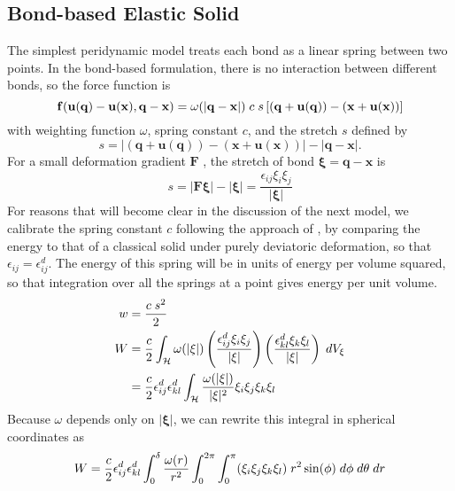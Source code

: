 \subsection{Bond-based Elastic Solid}
The simplest peridynamic model treats each bond as a linear spring between two points.
In the bond-based formulation, there is no interaction between different bonds, so the force function is
%
\begin{equation}
\mathit{\mathbf{f}}(\mathbf{u}(\mathbf{q})-\mathbf{u}(\mathbf{x}),\mathbf{q}-\mathbf{x}) = \omega(|\mathbf{q}-\mathbf{x}|)\;c\;s \left[(\mathbf{q}+\mathbf{u}(\mathbf{q}))-(\mathbf{x}+\mathbf{u}(\mathbf{x}))\right]
\end{equation}
%
with weighting function $\omega$, spring constant $c$, and the stretch $s$ defined by
%
\begin{equation}
\label{eq:stretch}
s = |(\mathbf{q}+\mathbf{u}(\mathbf{q}))-(\mathbf{x}+\mathbf{u}(\mathbf{x}))| - |\mathbf{q}-\mathbf{x}|.
\end{equation}
%
For a small deformation gradient $\mathbf{F}$ , the stretch of bond $\boldsymbol{\xi}=\mathbf{q}-\mathbf{x}$ is
%
\begin{equation*}
s = |\mathbf{F}\boldsymbol{\xi}|-|\boldsymbol{\xi}| = \frac{\epsilon_{ij}\xi_i\xi_j}{|\boldsymbol{\xi}|}
\end{equation*}
%
For reasons that will become clear in the discussion of the next model, we calibrate the spring constant $c$ following the approach of \cite{silling2007peridynamic}, by comparing the energy to that of a classical solid under purely deviatoric deformation, so that $\epsilon_{ij} = \epsilon_{ij}^d$.
The energy of this spring will be in units of energy per volume squared, so that integration over all the springs at a point gives energy per unit volume.
%
\begin{align}
\label{eq:deviatoricStrainEnergy}
w &= \frac{c\;s^2}{2}\notag \\
W &= \frac{c}{2}\int_\mathcal{H} \omega(|\xi|)\left( \frac{\epsilon_{ij}^d\xi_i\xi_j}{|\xi|} \right)\left( \frac{\epsilon_{kl}^d\xi_k\xi_l}{|\xi|} \right)\;dV_\xi\notag\\
&= \frac{c}{2}\epsilon_{ij}^d \epsilon_{kl}^d \int_\mathcal{H} \frac{\omega(|\xi|)}{|\xi|^2}\xi_i\xi_j\xi_k\xi_l 
\end{align}
%
Because $\omega$ depends only on $|\boldsymbol{\xi}|$, we can rewrite this integral in spherical coordinates as
%
\begin{equation}
W= \frac{c}{2}\epsilon_{ij}^d \epsilon_{kl}^d \int_0^\delta \frac{\omega(r)}{r^2}\int_0^{2\pi}\int_0^\pi (\xi_i\xi_j\xi_k\xi_l)\;r^2 \sin(\phi)\;d\phi\;d\theta\;dr\notag
\end{equation}
